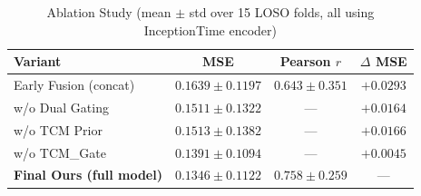 \documentclass{article}
\begin{document}
\begin{table}[htbp]
\centering
\caption{Ablation Study (mean $\pm$ std over 15 LOSO folds, all using InceptionTime encoder)}
\label{tab:ablation}
\begin{tabular}{lccc}
\toprule
\textbf{Variant} & \textbf{MSE} & \textbf{Pearson $r$} & \textbf{$\Delta$ MSE} \\
\midrule
Early Fusion (concat) & $0.1639 \pm 0.1197$ & $0.643 \pm 0.351$ & $+0.0293$ \\
w/o Dual Gating       & $0.1511 \pm 0.1322$ & --- & $+0.0164$ \\
w/o TCM Prior         & $0.1513 \pm 0.1382$ & --- & $+0.0166$ \\
w/o TCM\_Gate         & $0.1391 \pm 0.1094$ & --- & $+0.0045$ \\
\midrule
\textbf{Final Ours (full model)} & $\mathbf{0.1346} \pm 0.1122$ & $\mathbf{0.758} \pm 0.259$ & --- \\
\bottomrule
\end{tabular}
\end{table}
\end{document}
